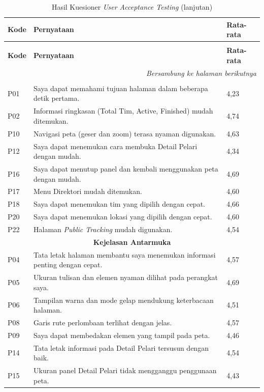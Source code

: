 \begin{longtable}{|p{1.2cm}|p{8.5cm}|p{2cm}|}
\caption{Hasil Kuesioner \textit{User Acceptance Testing}} \label{tab:uat-hasil} \\

\hline
\textbf{Kode} & \textbf{Pernyataan} & \textbf{Rata-rata} \\ \hline
\endfirsthead

\caption[]{Hasil Kuesioner \textit{User Acceptance Testing} (lanjutan)} \\
\hline
\textbf{Kode} & \textbf{Pernyataan} & \textbf{Rata-rata} \\ \hline
\endhead

\hline
\multicolumn{3}{r}{\textit{Bersambung ke halaman berikutnya}} \\
\endfoot

\hline
\endlastfoot

\multicolumn{3}{|c|}{\textbf{Kemudahan Penggunaan}} \\ \hline
P01 & Saya dapat memahami tujuan halaman dalam beberapa detik pertama. & 4,23 \\ \hline
P02 & Informasi ringkasan (Total Tim, Active, Finished) mudah ditemukan. & 4,74 \\ \hline
P10 & Navigasi peta (geser dan zoom) terasa nyaman digunakan. & 4,63 \\ \hline
P12 & Saya dapat menemukan cara membuka Detail Pelari dengan mudah. & 4,34 \\ \hline
P16 & Saya dapat menutup panel dan kembali menggunakan peta dengan mudah. & 4,69 \\ \hline
P17 & Menu Direktori mudah ditemukan. & 4,60 \\ \hline
P18 & Saya dapat menemukan tim yang dipilih dengan cepat. & 4,66 \\ \hline
P20 & Saya dapat menemukan lokasi yang dipilih dengan cepat. & 4,60 \\ \hline
P22 & Halaman \textit{Public Tracking} mudah digunakan. & 4,54 \\ \hline

\multicolumn{3}{|c|}{\textbf{Kejelasan Antarmuka}} \\ \hline
P04 & Tata letak halaman membantu saya menemukan informasi penting dengan cepat. & 4,57 \\ \hline
P05 & Ukuran tulisan dan elemen nyaman dilihat pada perangkat saya. & 4,69 \\ \hline
P06 & Tampilan warna dan mode gelap mendukung keterbacaan halaman. & 4,51 \\ \hline
P08 & Garis rute perlombaan terlihat dengan jelas. & 4,57 \\ \hline
P09 & Saya dapat membedakan elemen yang tampil pada peta. & 4,46 \\ \hline
P14 & Tata letak informasi pada Detail Pelari tersusun dengan baik. & 4,54 \\ \hline
P15 & Ukuran panel Detail Pelari tidak mengganggu penggunaan peta. & 4,43 \\ \hline


\end{longtable}
